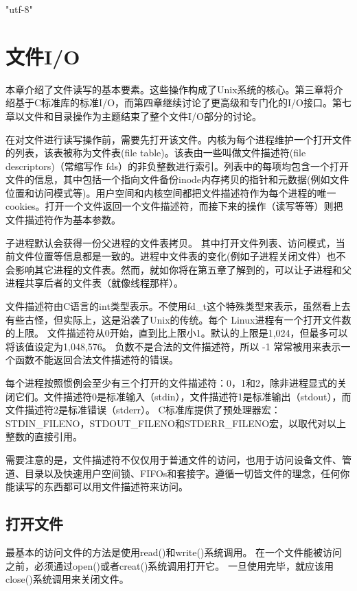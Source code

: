 \ifx\atempxetex\usewhat
\XeTeXinputencoding "utf-8"
\fi
{}

\chapter{文件I/O}

本章介绍了文件读写的基本要素。这些操作构成了Unix系统的核心。第三章将介绍基于C标准库的标准I/O，而第四章继续讨论了更高级和专门化的I/O接口。第七章以文件和目录操作为主题结束了整个文件I/O部分的讨论。

在对文件进行读写操作前，需要先打开该文件。内核为每个进程维护一个打开文件的列表，该表被称为文件表(file table)。该表由一些叫做文件描述符(file descriptors)（常缩写作 fds）的非负整数进行索引。列表中的每项均包含一个打开文件的信息，其中包括一个指向文件备份inode内存拷贝的指针和元数据(例如文件位置和访问模式等)。用户空间和内核空间都把文件描述符作为每个进程的唯一cookies。打开一个文件返回一个文件描述符，而接下来的操作（读写等等）则把文件描述符作为基本参数。

子进程默认会获得一份父进程的文件表拷贝。 其中打开文件列表、访问模式，当前文件位置等信息都是一致的。进程中文件表的变化(例如子进程关闭文件）也不会影响其它进程的文件表。然而，就如你将在第五章了解到的，可以让子进程和父进程共享后者的文件表（就像线程那样）。

文件描述符由C语言的int类型表示。不使用fd\_t这个特殊类型来表示，虽然看上去有些古怪，但实际上，这是沿袭了Unix的传统。每个 Linux进程有一个打开文件数的上限。 文件描述符从0开始，直到比上限小1。默认的上限是1,024，但最多可以将该值设定为1,048,576。 负数不是合法的文件描述符，所以 -1 常常被用来表示一个函数不能返回合法文件描述符的错误。

每个进程按照惯例会至少有三个打开的文件描述符：0，1和2，除非进程显式的关闭它们。文件描述符0是标准输入（stdin），文件描述符1是标准输出（stdout），而文件描述符2是标准错误（stderr）。 C标准库提供了预处理器宏：STDIN\_FILENO，STDOUT\_FILENO和STDERR\_FILENO宏，以取代对以上整数的直接引用。

需要注意的是，文件描述符不仅仅用于普通文件的访问，也用于访问设备文件、管道、目录以及快速用户空间锁、FIFOs和套接字。遵循一切皆文件的理念，任何你能读写的东西都可以用文件描述符来访问。 

\section{打开文件}
最基本的访问文件的方法是使用read()和write()系统调用。 在一个文件能被访问之前，必须通过open()或者creat()系统调用打开它。 一旦使用完毕，就应该用close()系统调用来关闭文件。 

